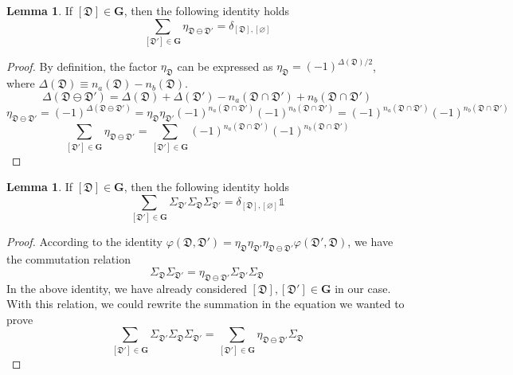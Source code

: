 \documentclass[12font]{article}
\numberwithin{equation}{section}    %
\theoremstyle{definition}
\newtheorem{lemma}[theorem]{Lemma}
\newcommand{\abs}[1]{\left|  #1  \right|}
\newcommand{\mrm}[1]{\mathrm{#1}}
\newcommand{\bo}[1]{\mathbf{#1}}
\begin{document}
\begin{lemma}
    If $[\mathfrak{D}]\in\bo{G}$, then the following identity holds
    \[
    \sum_{[\mathfrak{D}']\in\bo{G}}\eta_{\mathfrak{D}\ominus\mathfrak{D}'} 
    = 
    \delta_{[\mathfrak{D}],[\varnothing]}
    \]
\end{lemma}
\begin{proof}
    By definition, the factor $\eta_{\mathfrak{D}}$ can be expressed as $\eta_{\mathfrak{D}} = (-1)^{\Delta(\mathfrak{D})/2}$, where $\Delta(\mathfrak{D}) \equiv n_a(\mathfrak{D})-n_b(\mathfrak{D})$. 
    \[
    \Delta(\mathfrak{D}\ominus\mathfrak{D}') 
    = 
    \Delta(\mathfrak{D})
    +
    \Delta(\mathfrak{D}')
    - n_a(\mathfrak{D}\cap\mathfrak{D}') 
    + n_b(\mathfrak{D}\cap\mathfrak{D}') 
    \]
    \[
    \eta_{\mathfrak{D}\ominus\mathfrak{D}'}
    =
    (-1)^{\Delta(\mathfrak{D}\ominus\mathfrak{D}')}
    =
    \eta_{\mathfrak{D}}\eta_{\mathfrak{D}'}
    (-1)^{n_a(\mathfrak{D}\cap\mathfrak{D}') }(-1)^{n_b(\mathfrak{D}\cap\mathfrak{D}')}
    =
    (-1)^{n_a(\mathfrak{D}\cap\mathfrak{D}') }(-1)^{n_b(\mathfrak{D}\cap\mathfrak{D}')}
    \]
    \[
    \sum_{[\mathfrak{D}']\in\bo{G}} \eta_{\mathfrak{D}\ominus\mathfrak{D}'}
    =
    \sum_{[\mathfrak{D}']\in\bo{G}}(-1)^{n_a(\mathfrak{D}\cap\mathfrak{D}') }(-1)^{n_b(\mathfrak{D}\cap\mathfrak{D}')}
    \]
\end{proof}
\begin{lemma}
    If $[\mathfrak{D}]\in\bo{G}$, then the following identity holds
    \[
    \sum_{[\mathfrak{D}']\in\bo{G}} \Sigma_{\mathfrak{D}'}\Sigma_{\mathfrak{D}}\Sigma_{\mathfrak{D}'} 
    = 
    \delta_{[\mathfrak{D}],[\varnothing]}
    \mathds{1}
    \]
\end{lemma}
\begin{proof}
    According to the identity $\varphi(\mathfrak{D},\mathfrak{D}') = \eta_{\mathfrak{D}}\eta_{\mathfrak{D}'}\eta_{\mathfrak{D}\ominus\mathfrak{D}'}\varphi(\mathfrak{D}',\mathfrak{D})$, we have the commutation relation 
    \[
    \Sigma_{\mathfrak{D}}\Sigma_{\mathfrak{D}'} = \eta_{\mathfrak{D}\ominus\mathfrak{D}'} \Sigma_{\mathfrak{D}'}\Sigma_{\mathfrak{D}}
    \]
    In the above identity, we have already considered $[\mathfrak{D}],[\mathfrak{D}']\in\bo{G}$ in our case. With this relation, we could rewrite the summation in the equation we wanted to prove
    \[
    \sum_{[\mathfrak{D}']\in\bo{G}} \Sigma_{\mathfrak{D}'}\Sigma_{\mathfrak{D}}\Sigma_{\mathfrak{D}'}
    =
    \sum_{[\mathfrak{D}']\in\bo{G}} 
    \eta_{\mathfrak{D}\ominus\mathfrak{D}'}
    \Sigma_{\mathfrak{D}}
    \]
\end{proof}



\end{document}
